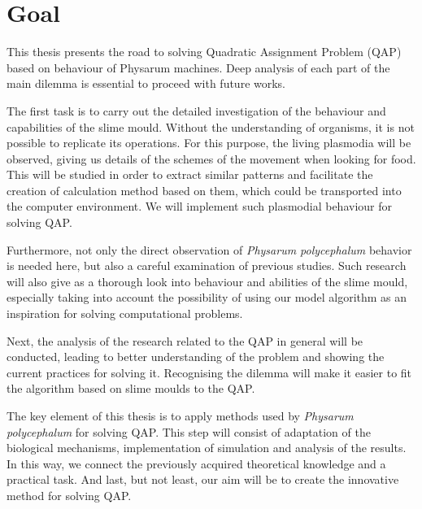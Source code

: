 \section{Goal}
\label{section:introduction_goal}

This thesis presents the road to solving Quadratic Assignment Problem (QAP) based on behaviour of Physarum machines.
Deep analysis of each part of the main dilemma is essential to proceed with future works.

The first task is to carry out the detailed investigation of the behaviour and capabilities of the slime mould. Without the understanding of organisms, it is not possible to replicate its operations. For this purpose, the living plasmodia will be observed, giving us details of the schemes of the movement when looking for food. This will be studied in order to extract similar patterns and facilitate the creation of
calculation method based on them, which could be transported into the computer environment. We will implement such plasmodial behaviour for solving QAP.

Furthermore, not only the direct observation of \textit{Physarum polycephalum} behavior is needed here, but also a careful examination of previous studies. Such research will also give as a thorough look into behaviour and abilities of the slime mould, especially taking into account the possibility of using our model algorithm as an inspiration for solving computational problems.

Next, the analysis of the research related to the QAP in general will be conducted, leading to better understanding of the problem and showing the current practices for solving it. Recognising the dilemma will make it easier to fit the algorithm based on slime moulds to the QAP.

The key element of this thesis is to apply methods used by \textit{Physarum polycephalum} for solving QAP. This step will consist of adaptation of the biological mechanisms, implementation of simulation and analysis of the results. In this way, we connect the previously acquired theoretical knowledge and a practical task. And last, but not least, our aim will be to create the innovative method for solving QAP.
